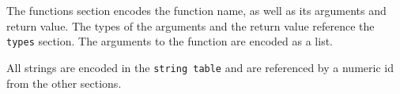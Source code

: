 The functions section encodes the function name, as well as its arguments
and return value.  The types of the arguments and the return value
reference the \verb|types| section.  The arguments to the function
are encoded as a list.

All strings are encoded in the \verb|string table| and are referenced by
a numeric id from the other sections.

